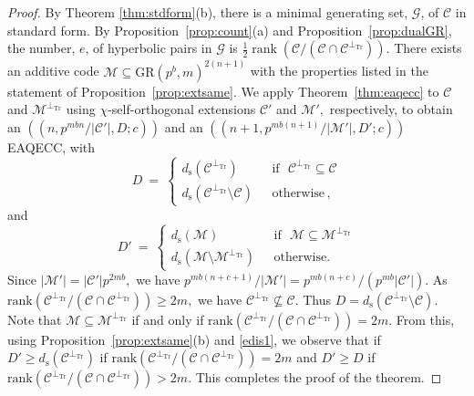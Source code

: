 \documentclass{article}
\DeclareMathOperator{\Tr}{Tr}
\DeclareMathOperator{\rank}{rank}
\theoremstyle{remark}
\theoremstyle{definition}
\numberwithin{equation}{section}
\begin{document}
\begin{proof} By Theorem \ref{thm:stdform}(b), there is a minimal generating set, $\mathcal{G}$, of $\mathcal{C}$ in standard form. By Proposition~\ref{prop:count}(a) and Proposition~\ref{prop:dualGR}, the number, $e$, of hyperbolic pairs in $\mathcal{G}$ is $\frac12 \rank(\mathcal{C}/(\mathcal{C} \cap \mathcal{C}^{\perp_{\Tr}}))$. There exists an additive code $\mathcal{M}\subseteq \text{GR}(p^b,m)^{2(n+1)}$ with the properties listed in the statement of Proposition~\ref{prop:extsame}. We apply Theorem~\ref{thm:eaqecc} to $\mathcal{C}$ and $\mathcal{M}^{\perp_{\Tr}}$ using $\chi$-self-orthogonal extensions $\mathcal{C}'$ and $\mathcal{M}',$ respectively,  to obtain an $((n,p^{mbn}/{|\mathcal{C}'|},D;c))$  and an $((n+1,p^{mb(n+1)}/{|\mathcal{M}'|},D';c))$ EAQECC, with 
 \begin{equation*}
D~=~\left\{\begin{array}{ll}
d_{\mathrm{s}}(\mathcal{C}^{\perp_{\Tr}}) & \text{~~if~~} \mathcal{C}^{\perp_{\Tr}} \subseteq \mathcal{C} \\
d_{\mathrm{s}}(\mathcal{C}^{\perp_{\Tr}}\setminus \mathcal{C} )  & \text{~~otherwise}\,,
\end{array}\right.
\end{equation*} and   \begin{equation}\label{edis1}
D'~=~\left\{\begin{array}{ll}
d_{\mathrm{s}}(\mathcal{M}) & \text{~~if~~} \mathcal{M} \subseteq \mathcal{M}^{\perp_{\Tr}} \\
d_{\mathrm{s}}(\mathcal{M}\setminus \mathcal{M}^{\perp_{\Tr}} )  & \text{~~otherwise}.\,
\end{array}\right.
\end{equation}  Since $|\mathcal{M}'|=|\mathcal{C}'|p^{2mb},$  we have   $p^{mb(n+c+1)}/{|\mathcal{M}'|}=p^{mb(n+c)}/{(p^{mb}|\mathcal{C}'|)}.$
As $\text{rank}(\mathcal{C}^{\perp_{\Tr}}/(\mathcal{C}  \cap  \mathcal{C}^{\perp_{\Tr}})) \geq 2m,$ we have $\mathcal{C}^{\perp_{\Tr}} \not\subseteq \mathcal{C}.$ Thus $D=d_{\mathrm{s}}(\mathcal{C}^{\perp_{\Tr}}\setminus \mathcal{C} ).$ Note that $\mathcal{M} \subseteq \mathcal{M}^{\perp_{\Tr}}$ if and only if $\text{rank} (\mathcal{C}^{\perp_{\Tr}}/(\mathcal{C}  \cap  \mathcal{C}^{\perp_{\Tr}})) =2m.$ 
 From this, using Proposition~\ref{prop:extsame}(b) and \eqref{edis1}, we observe that if   $D' \geq d_{\mathrm{s}}(\mathcal{C}^{\perp_{\Tr}}) $ if $\text{rank} (\mathcal{C}^{\perp_{\Tr}}/(\mathcal{C}  \cap  \mathcal{C}^{\perp_{\Tr}})) =2m$ and $D' \geq D$ if $\text{rank} (\mathcal{C}^{\perp_{\Tr}}/(\mathcal{C}  \cap  \mathcal{C}^{\perp_{\Tr}})) >2m.$ This completes the proof of the theorem. \end{proof}
\end{document}

